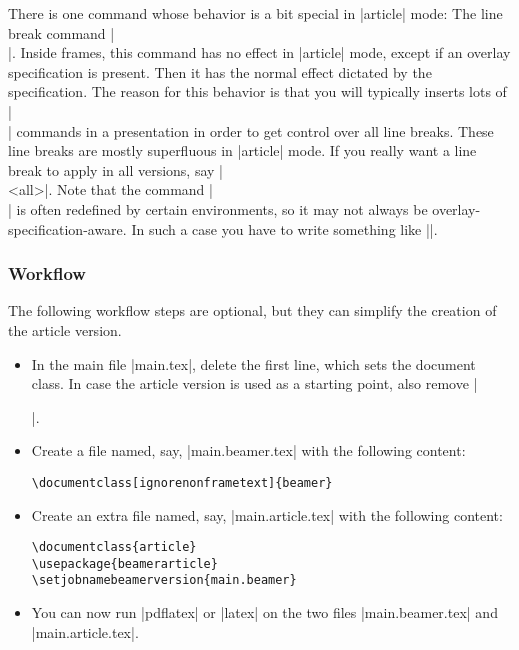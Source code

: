 There is one command whose behavior is a bit special in |article| mode: The line break command |\\|. Inside frames, this command has no effect in |article| mode, except if an overlay specification is present. Then it has the normal effect dictated by the specification. The reason for this behavior is that you will typically inserts lots of |\\| commands in a presentation in order to get control over all line breaks. These line breaks are mostly superfluous in |article| mode. If you really want a line break to apply in all versions, say |\\<all>|. Note that the command |\\| is often redefined by certain environments, so it may not always be overlay-specification-aware. In such a case you have to write something like ||.

\subsubsection{Workflow}
\label{section-article-version-workflow}

The following workflow steps are optional, but they can simplify the creation of the article version.

\begin{itemize}
\item
  In the main file |main.tex|, delete the first line, which sets the document class. In case the article version is used as a starting point, also remove |\usepackage{beamerarticle}|.
\item
  Create a file named, say, |main.beamer.tex| with the following content:

\begin{verbatim}
\documentclass[ignorenonframetext]{beamer}

\end{verbatim}

\item
  Create an extra file named, say, |main.article.tex| with the following content:

\begin{verbatim}
\documentclass{article}
\usepackage{beamerarticle}
\setjobnamebeamerversion{main.beamer}

\end{verbatim}

\item
  You can now run |pdflatex| or |latex| on the two files |main.beamer.tex| and |main.article.tex|.
\end{itemize}

